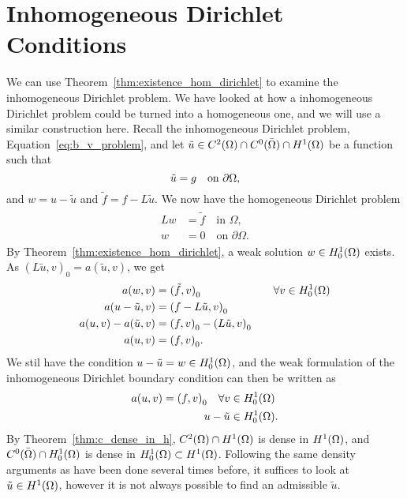 \section{Inhomogeneous Dirichlet Conditions}
We can use Theorem~\ref{thm:existence_hom_dirichlet} to examine the inhomogeneous Dirichlet problem.
We have looked at how a inhomogeneous 
Dirichlet problem could be turned into a homogeneous one, and we will use 
a similar construction here. Recall the inhomogeneous Dirichlet problem, Equation~\eqref{eq:b_v_problem}, and let 
$\tilde{u} \in C^2(\Omega)\cap C^0(\bar{\Omega}) \cap H^1(\Omega)$ be a function such that 
\begin{equation*}
   \tilde{u} = g \quad \text{on } \partial \Omega,
\end{equation*}
and $w = u-\tilde{u}$ and $\tilde{f} = f-L\tilde{u}$. We now have the homogeneous 
Dirichlet problem 
\begin{align}
\begin{split}
    Lw &= \tilde{f} \quad \text{in } \Omega,  \\
    w &= 0 \quad \text{on } \partial \Omega. 
\end{split}
\end{align}
By Theorem~\ref{thm:existence_hom_dirichlet},
 a weak solution $w \in H_0^1(\Omega)$ exists. As ${(L\tilde{u},v)}_0 = a(\tilde{u},v)$,
we get
\begin{alignat*}{2}
      a(w,v) &= {(\tilde{f},v)}_0 \quad &&\forall v \in H_0^1(\Omega) \\
      a(u-\tilde{u},v) &= {(f-L\tilde{u},v)}_0 &&\\
      a(u,v) - a(\tilde{u},v) &= {(f,v)}_0 - {(L\tilde{u},v)}_0 \quad && \\
      a(u,v) &= {(f,v)}_0. &&
\end{alignat*}
We stil have the condition $u-\tilde{u}=w\in H_0^1(\Omega)$, and the weak formulation 
of the inhomogeneous Dirichlet boundary condition can then be written as
\begin{align*}
   a(u,v) = {(f,v)}_0 \quad \forall v &\in H_0^1(\Omega) \\
   u-\tilde{u} & \in H_0^1(\Omega).
\end{align*}
By Theorem~\ref{thm:c_dense_in_h}, $C^2(\Omega)\cap H^1(\Omega)$ is dense in $H^1(\Omega)$, 
and $C^0(\bar{\Omega})\cap H^1_0(\Omega)$ 
is dense in $H^1_0(\Omega) \subset H^1(\Omega)$. Following the same density arguments 
as have been done several times before, it suffices to look at $\tilde{u}\in H^1(\Omega)$, however it is not always possible to find an admissible $\tilde{u}$.

